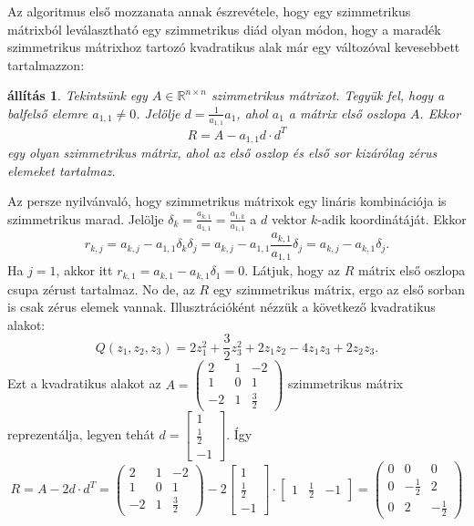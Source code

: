 \documentclass[a4paper, showtrims]{memoir}
\makeatletter
\renewenvironment{proof}[1][\proofname]
    {\par\pushQED{\qed}%
    \normalfont \topsep6\p@\@plus6\p@\relax
    \trivlist
    \item[\hskip\labelsep
        \itshape
    #1\@addpunct{:}]\ignorespaces}
    {\popQED\endtrivlist\@endpefalse}
\theoremstyle{plain}
\newtheorem{proposition}{állítás}[chapter]
\theoremstyle{remark}
\theoremstyle{definition}
\makeatother
\begin{document}
Az algoritmus első mozzanata annak észrevétele, 
hogy egy szimmetrikus mátrixból leválasztható egy szimmetrikus diád olyan módon,
hogy a maradék szimmetrikus mátrixhoz tartozó kvadratikus alak már egy változóval kevesebbett tartalmazzon:
\begin{proposition}
    Tekintsünk egy $A\in\mathbb{R}^{n\times n}$ szimmetrikus mátrixot.
    Tegyük fel, hogy a balfelső elemre $a_{1,1}\neq 0$.
    Jelölje $d=\frac{1}{a_{1,1}}a_1$, ahol $a_1$ a mátrix első oszlopa $A$.
    Ekkor
    \[
        R=A-a_{1,1}d\cdot d^T
   \]
   egy olyan szimmetrikus mátrix, 
   ahol az első oszlop és első sor kizárólag zérus elemeket tartalmaz.
\end{proposition}
\begin{proof}
    Az persze nyilvánvaló, hogy szimmetrikus mátrixok egy lináris kombinációja is szimmetrikus marad.
    Jelölje $\delta_k=\frac{a_{k,1}}{a_{1,1}}=\frac{a_{1,k}}{a_{1,1}}$ a $d$ vektor $k$-adik koordinátáját.
    Ekkor 
    \[
        r_{k,j}=
        a_{k,j}-a_{1,1}\delta_k\delta_j=
        a_{k,j}-a_{1,1}\frac{a_{k,1}}{a_{1,1}}\delta_j=
        a_{k,j}-a_{k,1}\delta_j.
        \tag{\dag}
    \]
    Ha $j=1$, akkor itt $r_{k,1}=a_{k,1}-a_{k,1}\delta_1=0$.
    Látjuk, hogy az $R$ mátrix első oszlopa csupa zérust tartalmaz. 
    No de, az $R$ egy szimmetrikus mátrix, ergo az első sorban is csak zérus elemek vannak.
    \end{proof}
    Illusztrációként nézzük a következő kvadratikus alakot:
    \[
        Q\left( z_1,z_2,z_3 \right)
        =
        2z_1^2+\frac{3}{2}z_3^2+2z_1z_2-4z_1z_3+2z_2z_3.
    \]
    Ezt a kvadratikus alakot az 
    \(A=
    \begin{pmatrix}
        2&1&-2\\
        1&0&1\\
        -2&1&\frac{3}{2}
    \end{pmatrix}
    \)
    szimmetrikus mátrix reprezentálja, 
    legyen tehát 
    \(d=
    \begin{bmatrix}
        1\\ \frac{1}{2}\\ -1
    \end{bmatrix}.
    \)
    Így 
    \[
        R=A-2d\cdot d^T
        =
        \begin{pmatrix}
        2&1&-2\\
        1&0&1\\
        -2&1&\frac{3}{2}
        \end{pmatrix}
        -2
        \begin{bmatrix}
        1\\ \frac{1}{2}\\ -1
        \end{bmatrix}
        \cdot
        \begin{bmatrix}
        1& \frac{1}{2}& -1
        \end{bmatrix}
        =
        \begin{pmatrix}
            0&0&0\\
            0&-\frac{1}{2}&2\\
            0&2&-\frac{1}{2}
        \end{pmatrix}
    \]
\end{document}
